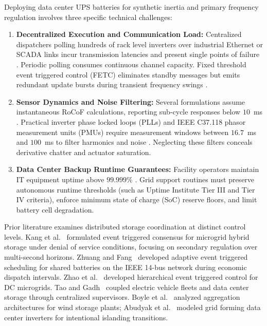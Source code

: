 \documentclass[preprint,12pt]{elsarticle}
\begin{document}
Deploying data center UPS batteries for synthetic inertia and primary frequency regulation involves three specific technical challenges:
\begin{enumerate}
    \item \textbf{Decentralized Execution and Communication Load:} Centralized dispatchers polling hundreds of rack level inverters over industrial Ethernet or SCADA links incur transmission latencies and present single points of failure \cite{boyle2024aggregator}. Periodic polling consumes continuous channel capacity. Fixed threshold event triggered control (FETC) eliminates standby messages but emits redundant update bursts during transient frequency swings \cite{tabuada2007,zhuang2025dses}.
    \item \textbf{Sensor Dynamics and Noise Filtering:} Several formulations assume instantaneous RoCoF calculations, reporting sub-cycle responses below $10$~ms \cite{dimarogonas2012}. Practical inverter phase locked loops (PLLs) and IEEE C37.118 phasor measurement units (PMUs) require measurement windows between $16.7$~ms and $100$~ms to filter harmonics and noise \cite{ieeec37118}. Neglecting these filters conceals derivative chatter and actuator saturation.
    \item \textbf{Data Center Backup Runtime Guarantees:} Facility operators maintain IT equipment uptime above $99.999\%$ \cite{yu2025reliability}. Grid support routines must preserve autonomous runtime thresholds (such as Uptime Institute Tier III and Tier IV criteria), enforce minimum state of charge (SoC) reserve floors, and limit battery cell degradation.
\end{enumerate}

Prior literature examines distributed storage coordination at distinct control levels. Kang et al.~\cite{kang2024hess} formulated event triggered consensus for microgrid hybrid storage under denial of service conditions, focusing on secondary regulation over multi-second horizons. Zhuang and Fang~\cite{zhuang2025dses} developed adaptive event triggered scheduling for shared batteries on the IEEE 14-bus network during economic dispatch intervals. Zhao et al.~\cite{zhao2025epsr} developed hierarchical event triggered control for DC microgrids. Tao and Gadh~\cite{tao2025coordinated} coupled electric vehicle fleets and data center storage through centralized supervisors. Boyle et al.~\cite{boyle2024aggregator} analyzed aggregation architectures for wind storage plants; Abudyak et al.~\cite{abudyak2026gfm} modeled grid forming data center inverters for intentional islanding transitions.
\end{document}
